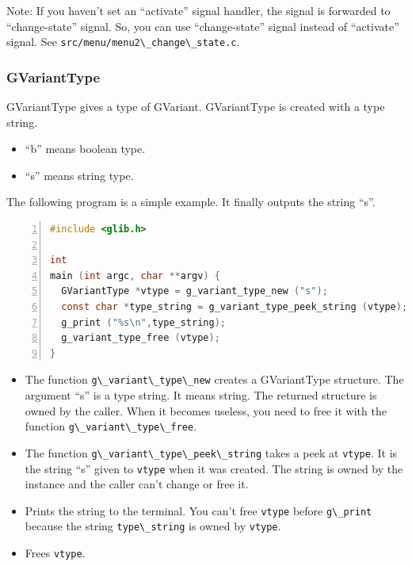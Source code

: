 Note: If you haven't set an ``activate'' signal handler, the signal is
forwarded to ``change-state'' signal. So, you can use ``change-state''
signal instead of ``activate'' signal. See
\passthrough{\lstinline!src/menu/menu2\_change\_state.c!}.

\subsubsection{GVariantType}\label{gvarianttype}

GVariantType gives a type of GVariant. GVariantType is created with a
type string.

\begin{itemize}
\tightlist
\item
  ``b'' means boolean type.
\item
  ``s'' means string type.
\end{itemize}

The following program is a simple example. It finally outputs the string
``s''.

\begin{lstlisting}[language=C, numbers=left]
#include <glib.h>

int
main (int argc, char **argv) {
  GVariantType *vtype = g_variant_type_new ("s");
  const char *type_string = g_variant_type_peek_string (vtype);
  g_print ("%s\n",type_string);
  g_variant_type_free (vtype);
}
\end{lstlisting}

\begin{itemize}
\tightlist
\item
  The function \passthrough{\lstinline!g\_variant\_type\_new!} creates a
  GVariantType structure. The argument ``s'' is a type string. It means
  string. The returned structure is owned by the caller. When it becomes
  useless, you need to free it with the function
  \passthrough{\lstinline!g\_variant\_type\_free!}.
\item
  The function \passthrough{\lstinline!g\_variant\_type\_peek\_string!}
  takes a peek at \passthrough{\lstinline!vtype!}. It is the string
  ``s'' given to \passthrough{\lstinline!vtype!} when it was created.
  The string is owned by the instance and the caller can't change or
  free it.
\item
  Prints the string to the terminal. You can't free
  \passthrough{\lstinline!vtype!} before
  \passthrough{\lstinline!g\_print!} because the string
  \passthrough{\lstinline!type\_string!} is owned by
  \passthrough{\lstinline!vtype!}.
\item
  Frees \passthrough{\lstinline!vtype!}.
\end{itemize}

